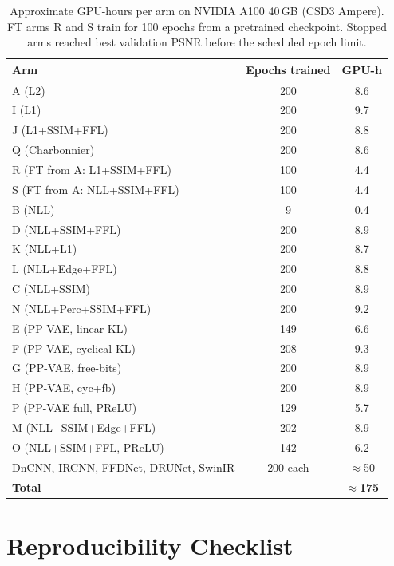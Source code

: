 \documentclass[12pt, a4paper, twoside, openright]{book}
\begin{document}
\begin{appendices}
\begin{table}[htbp]
\centering
\caption[Per-arm training GPU hours]{Approximate GPU-hours per arm on NVIDIA A100 40\,GB (CSD3 Ampere). FT arms R and S train for 100 epochs from a pretrained checkpoint. Stopped arms reached best validation PSNR before the scheduled epoch limit.}
\label{tab:app:compute:timing}
\begin{tabular}{lcc}
\toprule
\textbf{Arm} & \textbf{Epochs trained} & \textbf{GPU-h} \\
\midrule
A (L2)                   & 200 & 8.6 \\
I (L1)                   & 200 & 9.7 \\
J (L1+SSIM+FFL)          & 200 & 8.8 \\
Q (Charbonnier)          & 200 & 8.6 \\
R (FT from A: L1+SSIM+FFL) & 100 & 4.4 \\
S (FT from A: NLL+SSIM+FFL) & 100 & 4.4 \\
B (NLL)                  & 9   & 0.4 \\
D (NLL+SSIM+FFL)         & 200 & 8.9 \\
K (NLL+L1)               & 200 & 8.7 \\
L (NLL+Edge+FFL)         & 200 & 8.8 \\
C (NLL+SSIM)             & 200 & 8.9 \\
N (NLL+Perc+SSIM+FFL)    & 200 & 9.2 \\
E (PP-VAE, linear KL)    & 149 & 6.6 \\
F (PP-VAE, cyclical KL)  & 208 & 9.3 \\
G (PP-VAE, free-bits)    & 200 & 8.9 \\
H (PP-VAE, cyc+fb)       & 200 & 8.9 \\
P (PP-VAE full, PReLU)   & 129 & 5.7 \\
M (NLL+SSIM+Edge+FFL)    & 202 & 8.9 \\
O (NLL+SSIM+FFL, PReLU)  & 142 & 6.2 \\
\midrule
DnCNN, IRCNN, FFDNet, DRUNet, SwinIR & 200 each & $\approx$50 \\
\midrule
\textbf{Total} & & $\approx$\textbf{175} \\
\bottomrule
\end{tabular}
\end{table}

\chapter{Reproducibility Checklist}
\label{app:repro}


\end{appendices}
\end{document}
